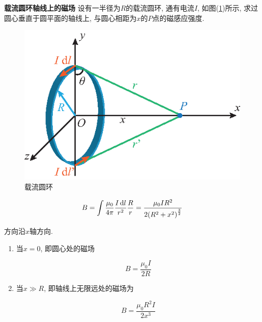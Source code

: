 \begin{example}
	\textbf{载流圆环轴线上的磁场} \quad 设有一半径为$R$的载流圆环, 通有电流$I$, 如图(\ref{C8-fig4})所示, 求过圆心垂直于圆平面的轴线上, 与圆心相距为$x$的$P$点的磁感应强度.
	
	\begin{figure}[H]
		\centering
		\includegraphics[scale=1.0]{C8-fig4.eps}
		\caption{载流圆环}
		\label{C8-fig4}
	\end{figure}
	 
	\begin{solution}
		
		\begin{equation*}
			B = \int \dfrac{\mu_0}{4 \pi} \dfrac{I \dd{l}}{r^2} \dfrac{R}{r} = \dfrac{\mu_0 I R^2}{2 \qty(R^2 + x^2)^{\frac{3}{2}}} 
		\end{equation*}
		
		方向沿$x$轴方向. 
		
		\begin{enumerate}[itemindent=1em]
			
			\item 当$x = 0$, 即圆心处的磁场
			
			\begin{equation*}
				B = \dfrac{\mu_0 I}{2 R}
			\end{equation*}
			
			\item 当$x \gg R$, 即轴线上无限远处的磁场为
			
			\begin{equation*}
				B = \dfrac{\mu_0 R^2 I}{2 x^3}
			\end{equation*}
			
		\end{enumerate}
		
	\end{solution}
	
\end{example}

